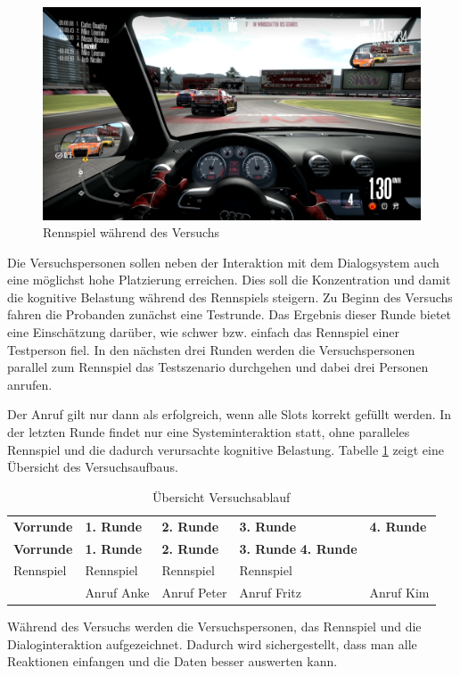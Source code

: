 \documentclass[12pt,a4paper]{scrartcl}
\begin{document}
\begin{figure}[H]
\begin{center}
\includegraphics[width=14cm]{nfs.png}
\caption{Rennspiel während des Versuchs}
\label{nfsss}
\end{center}
\end{figure}

Die Versuchspersonen sollen neben der Interaktion mit dem Dialogsystem auch eine möglichst hohe Platzierung erreichen. Dies soll die Konzentration und damit die kognitive Belastung während des Rennspiels steigern. Zu Beginn des Versuchs fahren die Probanden zunächst eine Testrunde. Das Ergebnis dieser Runde bietet eine Einschätzung darüber, wie schwer bzw. einfach das Rennspiel einer Testperson fiel. In den nächsten drei Runden werden die Versuchspersonen parallel zum Rennspiel das Testszenario durchgehen und dabei drei Personen anrufen. 

 Der Anruf gilt nur dann als erfolgreich, wenn alle Slots korrekt gefüllt werden. 
In der letzten Runde findet nur eine Systeminteraktion statt, ohne paralleles Rennspiel und die dadurch verursachte kognitive Belastung. 
Tabelle \ref{ablauf1} zeigt eine Übersicht des Versuchsaufbaus.

\begin{longtable}{p{}p{}p{}p{}p{} }
	\label{ablauf1}\\
	\caption[Übersicht Versuchsablauf]{Übersicht Versuchsablauf}\\
	\hline
	\textbf{Vorrunde}&\textbf{1. Runde}&\textbf{2. Runde} &\textbf{3. Runde} & \textbf{4. Runde}\\
	\hline
	\endfirsthead
	\hline
	\textbf{Vorrunde}&\textbf{1. Runde}&\textbf{2. Runde} &\textbf{3. Runde} \textbf{4. Runde}\\
	\hline
	\endhead
Rennspiel & Rennspiel & Rennspiel & Rennspiel &\\
 & Anruf Anke & Anruf Peter & Anruf Fritz & Anruf Kim \\
\hline
\end{longtable}
Während des Versuchs werden die Versuchspersonen, das Rennspiel und die Dialoginteraktion aufgezeichnet. Dadurch wird sichergestellt, dass man alle Reaktionen einfangen und die Daten besser auswerten kann. 
\end{document}
